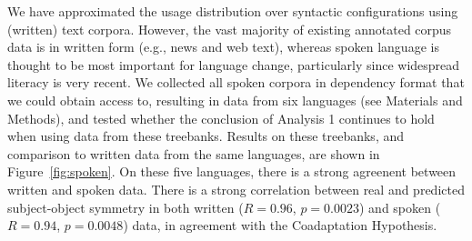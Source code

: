 \documentclass[11pt,a4paper]{article}
\newcommand\comment[1]{{\color{red}#1}}
\newcommand\mhahn[1]{{\color{red}(#1)}}
\begin{document}


We have approximated the usage distribution over syntactic configurations using (written) text corpora.
However, the vast majority of existing annotated corpus data is in written form (e.g., news and web text), whereas spoken language is thought to be most important for language change, particularly since widespread literacy is very recent.
We collected all spoken corpora in dependency format that we could obtain access to, resulting in data from six languages (see Materials and Methods), and tested whether the conclusion of Analysis 1 continues to hold when using data from these treebanks.
Results on these treebanks, and comparison to written data from the same languages, are shown in Figure~\ref{fig:spoken}.
On these five languages, there is a strong agreenent between written and spoken data.
There is a strong correlation between real and predicted subject-object symmetry in both written ($R=0.96$, $p=0.0023$) and spoken ($R=0.94$, $p=0.0048$) data, in agreement with the Coadaptation Hypothesis.





\end{document}
